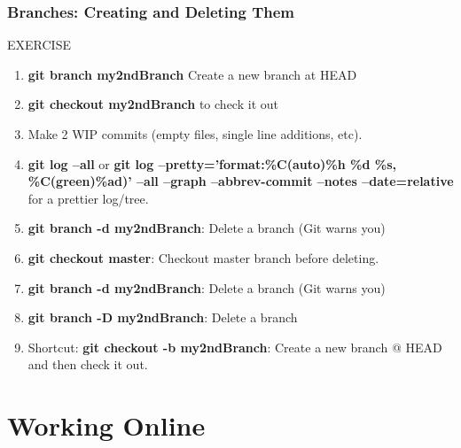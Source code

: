 \documentclass{beamer}
\begin{document}
\begin{frame}[fragile]
\frametitle{Branches: Creating and Deleting Them}
	\begin{block}{EXERCISE}
	\begin{enumerate}
		\item \textbf{git branch my2ndBranch } Create a new branch at HEAD
		\item \textbf{git checkout my2ndBranch} to check it out
		\item Make 2 WIP commits (empty files, single line additions, etc).
		\item \textbf{git log --all} or \textbf{git log --pretty='format:\%C(auto)\%h \%d \%s, \%C(green)\%ad)' --all --graph --abbrev-commit --notes --date=relative} for a prettier log/tree.
		\item \textbf{git branch -d my2ndBranch}: Delete a branch (Git warns you)
		\item \textbf{git checkout master}: Checkout master branch before deleting.
		\item \textbf{git branch -d my2ndBranch}: Delete a branch (Git warns you)
		\item \textbf{git branch -D my2ndBranch}: Delete a branch
		\item Shortcut: \textbf{git checkout -b my2ndBranch}: Create a new branch @ HEAD and then check it out.
	\end{enumerate}
\end{block}
\end{frame}

\section{Working Online}
\end{document}
